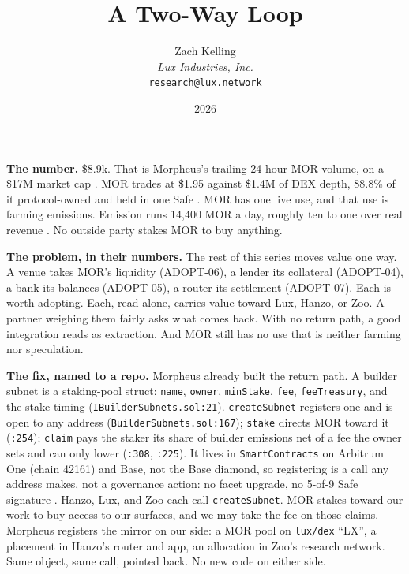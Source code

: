 \documentclass[11pt,a4paper]{article}
\title{A Two-Way Loop}
\author{Zach Kelling\\\textit{Lux Industries, Inc.}\\\texttt{research@lux.network}}
\date{2026}
\newcommand{\code}[1]{\texttt{\small #1}}
\newcommand{\prov}[1]{{\color{muted}\scriptsize\sffamily[#1]}}
\begin{document}
\luxcoverpage
\sloppy

\par
\vspace{0.9ex}

\noindent\textbf{The number.}
\$8.9k. That is Morpheus's trailing 24-hour MOR volume, on a \$17M market cap \prov{verified}. MOR
trades at \$1.95 against \$1.4M of DEX depth, 88.8\% of it protocol-owned and held in one Safe
\prov{verified}. MOR has one live use, and that use is farming emissions. Emission runs 14,400 MOR a
day, roughly ten to one over real revenue \prov{verified}. No outside party stakes MOR to buy
anything.

\vspace{0.35ex}
\noindent\textbf{The problem, in their numbers.}
The rest of this series moves value one way. A venue takes MOR's liquidity (ADOPT-06), a lender its
collateral (ADOPT-04), a bank its balances (ADOPT-05), a router its settlement (ADOPT-07). Each is
worth adopting. Each, read alone, carries value toward Lux, Hanzo, or Zoo. A partner weighing them
fairly asks what comes back. With no return path, a good integration reads as extraction. And MOR
still has no use that is neither farming nor speculation.

\vspace{0.35ex}
\noindent\textbf{The fix, named to a repo.}
Morpheus already built the return path. A builder subnet is a staking-pool struct: \code{name},
\code{owner}, \code{minStake}, \code{fee}, \code{feeTreasury}, and the stake timing
(\code{IBuilderSubnets.sol:21}). \code{createSubnet} registers one and is open to any address
(\code{BuilderSubnets.sol:167}); \code{stake} directs MOR toward it (\code{:254}); \code{claim} pays
the staker its share of builder emissions net of a fee the owner sets and can only lower
(\code{:308}, \code{:225}). It lives in \code{SmartContracts} on Arbitrum One (chain 42161) and
Base, not the Base diamond, so registering is a call any address makes, not a governance action: no
facet upgrade, no 5-of-9 Safe signature \prov{verified}. Hanzo, Lux, and Zoo each call
\code{createSubnet}. MOR stakes toward our work to buy access to our surfaces, and we may take the
fee on those claims. Morpheus registers the mirror on our side: a MOR pool on \code{lux/dex} ``LX'',
a placement in Hanzo's router and app, an allocation in Zoo's research network. Same object, same
call, pointed back. No new code on either side.
\end{document}
